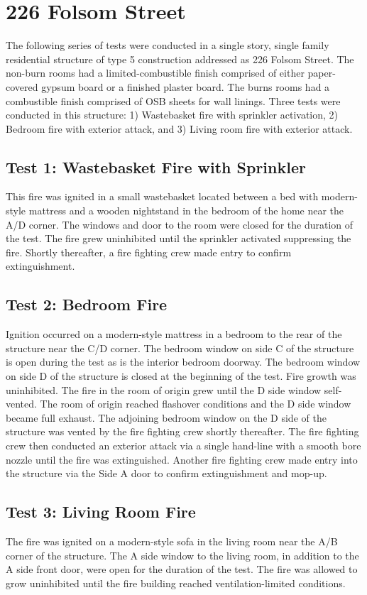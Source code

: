 \documentclass{article}
\begin{document}
  \section{226 Folsom Street}
  
  The following series of tests were conducted in a single story, single family residential structure of type 5 construction addressed as 226 Folsom Street. The non-burn rooms had a limited-combustible finish comprised of either paper-covered gypsum board or a finished plaster board.  The burns rooms had a combustible finish comprised of OSB sheets for wall linings.  Three tests were conducted in this structure: 1) Wastebasket fire with sprinkler activation, 2) Bedroom fire with exterior attack, and 3) Living room fire with exterior attack. 
  
  \subsection{Test 1: Wastebasket Fire with Sprinkler}
  
  This fire was ignited in a small wastebasket located between a bed with modern-style mattress and a wooden nightstand in the bedroom of the home near the A/D corner. The windows and door to the room were closed for the duration of the test. The fire grew uninhibited until the sprinkler activated suppressing the fire.  Shortly thereafter, a fire fighting crew made entry to confirm extinguishment.  
  
  \subsection{Test 2: Bedroom Fire}
  
  Ignition occurred on a modern-style mattress in a bedroom to the rear of the structure near the C/D corner.  The bedroom window on side C of the structure is open during the test as is the interior bedroom doorway. The bedroom window on side D of the structure is closed at the beginning of the test. Fire growth was uninhibited.  The fire in the room of origin grew until the D side window self-vented.  The room of origin reached flashover conditions and the D side window became full exhaust. The adjoining bedroom window on the D side of the structure was vented by the fire fighting crew shortly thereafter. The fire fighting crew then conducted an exterior attack via a single hand-line with a smooth bore nozzle until the fire was extinguished.  Another fire fighting crew made entry into the structure via the Side A door to confirm extinguishment and mop-up.       
  
  \subsection{Test 3: Living Room Fire}
  
  The fire was ignited on a modern-style sofa in the living room near the A/B corner of the structure.  The A side window to the living room, in addition to the A side front door, were open for the duration of the test. The fire was allowed to grow uninhibited until the fire building reached ventilation-limited conditions.
\end{document}
